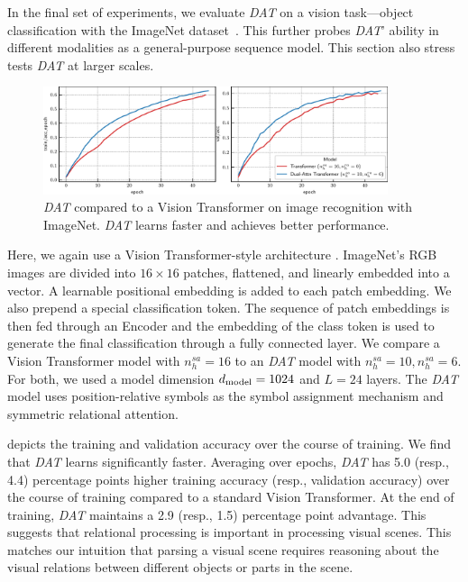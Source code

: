 In the final set of experiments, we evaluate \textit{DAT} on a vision task---object classification with the ImageNet dataset~\citep{imagenet}. This further probes \textit{DAT}' ability in different modalities as a general-purpose sequence model. This section also stress tests \textit{DAT} at larger scales.

\begin{figure}[ht]
    \centering
    \includegraphics[width=0.9\textwidth]{figs/experiments/imagenet/imagenet_acc_curves.pdf}
    \caption{\textit{DAT} compared to a Vision Transformer on image recognition with ImageNet. \textit{DAT} learns faster and achieves better performance.}\label{fig:vision_acc_curve}
\end{figure}

Here, we again use a Vision Transformer-style architecture \citep{dosovitskiyImageWorth16x162020}. ImageNet's RGB images are divided into $16 \times 16$ patches, flattened, and linearly embedded into a vector. A learnable positional embedding is added to each patch embedding. We also prepend a special classification token. The sequence of patch embeddings is then fed through an Encoder and the embedding of the class token is used to generate the final classification through a fully connected layer. We compare a Vision Transformer model with $n_h^{sa} = 16$ to an \textit{DAT} model with $n_h^{sa} = 10, n_h^{sa} = 6$. For both, we used a model dimension $d_{\mathrm{model}} = 1024$ and $L = 24$ layers. The \textit{DAT} model uses position-relative symbols as the symbol assignment mechanism and symmetric relational attention.

 depicts the training and validation accuracy over the course of training. We find that \textit{DAT} learns significantly faster. Averaging over epochs, \textit{DAT} has 5.0 (resp., 4.4) percentage points higher training accuracy (resp., validation accuracy) over the course of training compared to a standard Vision Transformer. At the end of training, \textit{DAT} maintains a 2.9 (resp., 1.5) percentage point advantage. This suggests that relational processing is important in processing visual scenes. This matches our intuition that parsing a visual scene requires reasoning about the visual relations between different objects or parts in the scene.

